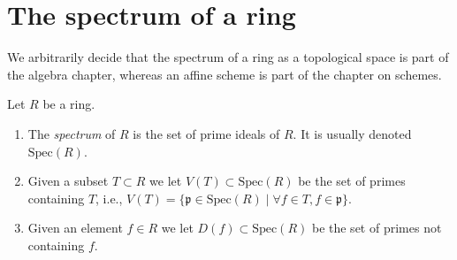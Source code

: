 \section{The spectrum of a ring}
\label{section-spectrum-ring}

\noindent
We arbitrarily decide that the spectrum of a ring as a topological space
is part of the algebra chapter, whereas an affine scheme is part of the
chapter on schemes.

\begin{definition}
\label{definition-spectrum-ring}
Let $R$ be a ring.
\begin{enumerate}
\item The {\it spectrum} of $R$ is the set of prime ideals of $R$.
It is usually denoted $\text{Spec}(R)$.
\item Given a subset $T \subset R$ we let $V(T) \subset \text{Spec}(R)$
be the set of primes containing $T$, i.e., $V(T) = \{ \mathfrak p \in
\text{Spec}(R) \mid \forall f\in T, f\in \mathfrak p\}$.
\item Given an element $f \in R$ we let $D(f) \subset \text{Spec}(R)$
be the set of primes not containing $f$.
\end{enumerate}
\end{definition}

